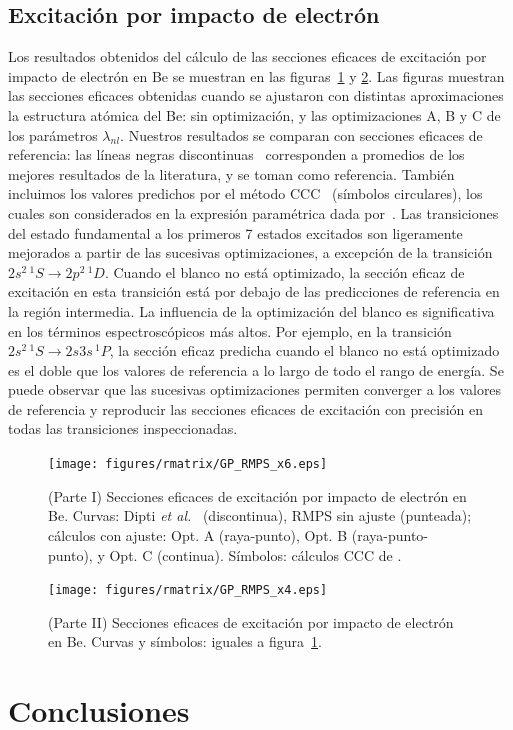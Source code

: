 \subsection{Excitación por impacto de electrón}

Los resultados obtenidos del cálculo de las secciones eficaces de 
excitación por impacto de electrón en Be se muestran en las 
figuras~\ref{fig:crossBe-partI} y \ref{fig:crossBe-partII}. Las figuras 
muestran las secciones eficaces obtenidas cuando se ajustaron con 
distintas aproximaciones la estructura atómica del Be: sin optimización, 
y las optimizaciones A, B y C de los parámetros $\lambda_{nl}$. Nuestros
resultados se comparan con secciones eficaces de referencia: las líneas
negras discontinuas~\cite{Dipti:19} corresponden a promedios de los 
mejores resultados de la literatura, y se toman como referencia. También
incluimos los valores predichos por el método CCC~\cite{Fursa:97} 
(símbolos circulares), los cuales son considerados en la expresión 
paramétrica dada por~\cite{Dipti:19}. Las transiciones del estado 
fundamental a los primeros 7 estados excitados son ligeramente mejorados 
a partir de las sucesivas optimizaciones, a excepción de la transición 
$2s^2\,^1S\rightarrow 2p^2\,^1D$. Cuando el blanco no está optimizado, 
la sección eficaz de excitación en esta transición está por debajo de 
las predicciones de referencia en la región intermedia. La influencia de 
la optimización del blanco es significativa en los términos 
espectroscópicos más altos. Por ejemplo, en la transición 
$2s^2\,^1S\rightarrow 2s3s\,^1P$, la sección eficaz predicha cuando el 
blanco no está optimizado es el doble que los valores de referencia a lo 
largo de todo el rango de energía. Se puede observar que las sucesivas 
optimizaciones permiten converger a los valores de referencia y 
reproducir las secciones eficaces de excitación con precisión en todas
las transiciones inspeccionadas. 

\begin{figure}
\centering
\texttt{[image: figures/rmatrix/GP\_RMPS\_x6.eps]} 
\caption[Secciones eficaces de excitación de Be (Parte I).]
{(Parte I) Secciones eficaces de excitación por impacto de electrón en Be. 
Curvas: Dipti \textit{et al.}~\cite{Dipti:19} (discontinua), RMPS sin 
ajuste (punteada); cálculos con ajuste: Opt. A (raya-punto), Opt. B 
(raya-punto-punto), y Opt. C (continua). 
Símbolos: cálculos CCC de \cite{Fursa:97}.}
\label{fig:crossBe-partI}
\end{figure}

\begin{figure}
\centering
\texttt{[image: figures/rmatrix/GP\_RMPS\_x4.eps]} 
\caption[Secciones eficaces de excitación de Be (Parte II).]
{(Parte II) Secciones eficaces de excitación por impacto de electrón en Be.
Curvas y símbolos: iguales a figura~\ref{fig:crossBe-partI}.}
\label{fig:crossBe-partII}
\end{figure}

\newpage
\section{Conclusiones}
